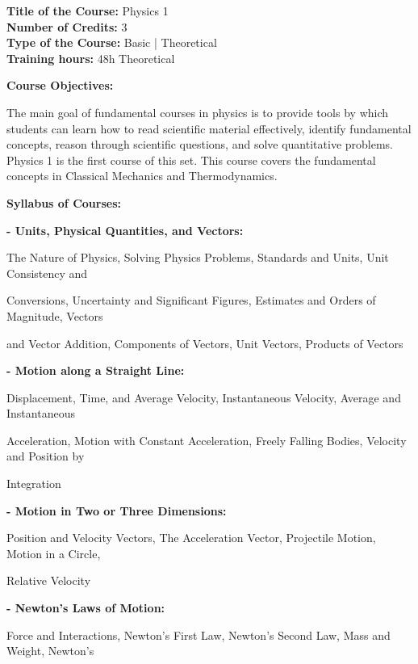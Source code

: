 \documentclass[12pt,a4paper]{article}
\begin{document}
\newpage
\textbf{Title of the Course:} Physics 1\\
\textbf{Number of Credits:} 3\\
\textbf{Type of the Course:} Basic | Theoretical\\
\textbf{Training hours:} 48h Theoretical\par\vspace{4pt}
\textbf{Course Objectives:}\par\vspace{2pt}
The main goal of fundamental courses in physics is to provide tools by which students can learn
how to read scientific material effectively, identify fundamental concepts, reason through scientific
questions, and solve quantitative problems. Physics 1 is the first course of this set. This course
covers the fundamental concepts in Classical Mechanics and Thermodynamics.\par\vspace{4pt}
\textbf{Syllabus of Courses:}\par\vspace{2pt}
\vspace{2pt}\textbf{- Units, Physical Quantities, and Vectors:}\par
The Nature of Physics, Solving Physics Problems, Standards and Units, Unit Consistency and\par
Conversions, Uncertainty and Significant Figures, Estimates and Orders of Magnitude, Vectors\par
and Vector Addition, Components of Vectors, Unit Vectors, Products of Vectors\par
\vspace{2pt}\textbf{- Motion along a Straight Line:}\par
Displacement, Time, and Average Velocity, Instantaneous Velocity, Average and Instantaneous\par
Acceleration, Motion with Constant Acceleration, Freely Falling Bodies, Velocity and Position by\par
Integration\par
\vspace{2pt}\textbf{- Motion in Two or Three Dimensions:}\par
Position and Velocity Vectors, The Acceleration Vector, Projectile Motion, Motion in a Circle,\par
Relative Velocity\par
\vspace{2pt}\textbf{- Newton’s Laws of Motion:}\par
Force and Interactions, Newton’s First Law, Newton’s Second Law, Mass and Weight, Newton’s\par
\end{document}
